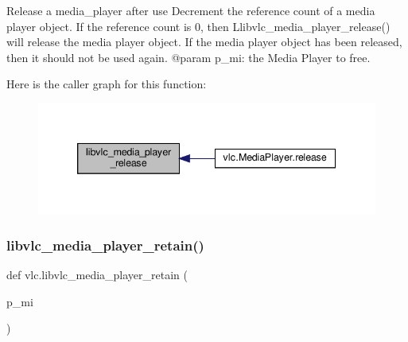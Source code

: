 \begin{DoxyVerb}Release a media_player after use
Decrement the reference count of a media player object. If the
reference count is 0, then L{libvlc_media_player_release}() will
release the media player object. If the media player object
has been released, then it should not be used again.
@param p_mi: the Media Player to free.
\end{DoxyVerb}
 Here is the caller graph for this function\+:
\nopagebreak
\begin{figure}[H]
\begin{center}
\leavevmode
\includegraphics[width=339pt]{namespacevlc_a81e3d692fb602bd1b936420d32fd5cff_icgraph}
\end{center}
\end{figure}
\mbox{\label{namespacevlc_aa0ba6b8fa96181ca59a4b12aa2b2ccde}} 
\subsubsection{\texorpdfstring{libvlc\+\_\+media\+\_\+player\+\_\+retain()}{libvlc\_media\_player\_retain()}}
{\footnotesize\ttfamily def vlc.\+libvlc\+\_\+media\+\_\+player\+\_\+retain (\begin{DoxyParamCaption}\item[{}]{p\+\_\+mi }\end{DoxyParamCaption})}


